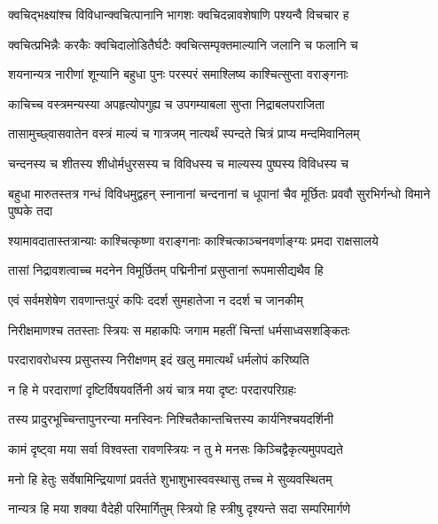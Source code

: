 \twolineshloka
{क्वचिद्भक्ष्यांश्च विविधान्क्वचित्पानानि भागशः}
{क्वचिदन्नावशेषाणि पश्यन्वै विचचार ह} %

\twolineshloka
{क्वचित्प्रभिन्नैः करकैः क्वचिदालोडितैर्घटैः}
{क्वचित्सम्पृक्तमाल्यानि जलानि च फलानि च} %

\twolineshloka
{शयनान्यत्र नारीणां शून्यानि बहुधा पुनः}
{परस्परं समाश्लिष्य काश्चित्सुप्ता वराङ्गनाः} %

\twolineshloka
{काचिच्च वस्त्रमन्यस्या अपहृत्योपगुह्य च}
{उपगम्याबला सुप्ता निद्राबलपराजिता} %

\twolineshloka
{तासामुच्छ्वासवातेन वस्त्रं माल्यं च गात्रजम्}
{नात्यर्थं स्पन्दते चित्रं प्राप्य मन्दमिवानिलम्} %

\twolineshloka
{चन्दनस्य च शीतस्य शीधोर्मधुरसस्य च}
{विविधस्य च माल्यस्य पुष्पस्य विविधस्य च} %

\threelineshloka
{बहुधा मारुतस्तत्र गन्धं विविधमुद्वहन्}
{स्नानानां चन्दनानां च धूपानां चैव मूर्छितः}
{प्रववौ सुरभिर्गन्धो विमाने पुष्पके तदा} %

\twolineshloka
{श्यामावदातास्तत्रान्याः काश्चित्कृष्णा वराङ्गनाः}
{काश्चित्काञ्चनवर्णाङ्ग्यः प्रमदा राक्षसालये} %

\twolineshloka
{तासां निद्रावशत्वाच्च मदनेन विमूर्छितम्}
{पद्मिनीनां प्रसुप्तानां रूपमासीद्यथैव हि} %

\twolineshloka
{एवं सर्वमशेषेण रावणान्तःपुरं कपिः}
{ददर्श सुमहातेजा न ददर्श च जानकीम्} %

\twolineshloka
{निरीक्षमाणश्च ततस्ताः स्त्रियः स महाकपिः}
{जगाम महतीं चिन्तां धर्मसाध्वसशङ्कितः} %

\twolineshloka
{परदारावरोधस्य प्रसुप्तस्य निरीक्षणम्}
{इदं खलु ममात्यर्थं धर्मलोपं करिष्यति} %

\twolineshloka
{न हि मे परदाराणां दृष्टिर्विषयवर्तिनी}
{अयं चात्र मया दृष्टः परदारपरिग्रहः} %

\twolineshloka
{तस्य प्रादुरभूच्चिन्तापुनरन्या मनस्विनः}
{निश्चितैकान्तचित्तस्य कार्यनिश्चयदर्शिनी} %

\twolineshloka
{कामं दृष्ट्वा मया सर्वा विश्वस्ता रावणस्त्रियः}
{न तु मे मनसः किञ्चिद्वैकृत्यमुपपद्यते} %

\twolineshloka
{मनो हि हेतुः सर्वेषामिन्द्रियाणां प्रवर्तते}
{शुभाशुभास्ववस्थासु तच्च मे सुव्यवस्थितम्} %

\twolineshloka
{नान्यत्र हि मया शक्या वैदेही परिमार्गितुम्}
{स्त्रियो हि स्त्रीषु दृश्यन्ते सदा सम्परिमार्गणे} %

